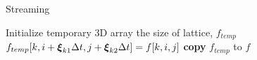 \begin{algorithm}
\caption{Streaming} \label{algo:streaming}
\begin{algorithmic}[1]
 
\Statex {}
\State Initialize temporary 3D array the size of lattice, $f_{temp}$
\Statex
{}
      \State $f_{temp}[k, i + \boldsymbol{\xi}_{k1} \Delta t, j + \boldsymbol{\xi}_{k2} \Delta t] = f[k, i, j]$
    \EndIf
  \EndFor
\EndFor
\Statex
\State \textbf{copy} $f_{temp}$ to $f$
\Statex
\EndProcedure
\end{algorithmic}
\end{algorithm}
